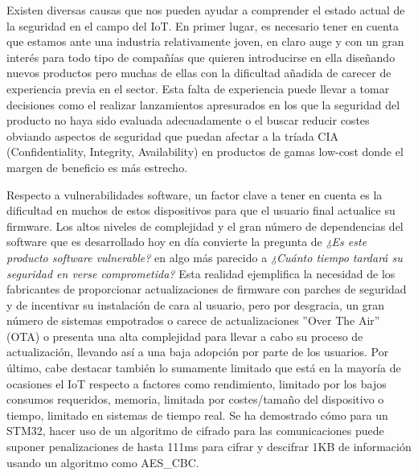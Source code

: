 Existen diversas causas que nos pueden ayudar a comprender el estado actual de la seguridad en el campo del IoT.
En primer lugar, es necesario tener en cuenta que estamos ante una industria relativamente 
joven, en claro auge y con un gran interés para todo tipo de compañías que quieren introducirse en ella diseñando 
nuevos productos pero muchas de ellas con la dificultad añadida de carecer de experiencia previa en el sector.
Esta falta de experiencia puede llevar a tomar decisiones como el realizar lanzamientos apresurados en los que la seguridad del producto no haya 
sido evaluada adecuadamente o el buscar reducir costes obviando aspectos de seguridad que puedan afectar a 
la tríada CIA (Confidentiality, Integrity, Availability) en productos de gamas low-cost donde el margen de beneficio 
es más estrecho.\bigskip

Respecto a vulnerabilidades software, un factor clave a tener en cuenta es la dificultad en muchos de estos 
dispositivos para que el usuario final actualice su firmware. Los altos niveles de complejidad y el gran número de dependencias del software
que es desarrollado hoy en día convierte la pregunta de \textit{¿Es este producto software vulnerable?} en algo más parecido a 
\textit{¿Cuánto tiempo tardará su seguridad en verse comprometida?} Esta realidad ejemplifica la necesidad de los fabricantes de 
proporcionar actualizaciones de firmware con parches de seguridad y de incentivar su instalación de cara al usuario, pero por 
desgracia, un gran número de sistemas empotrados o carece de actualizaciones ''Over The Air'' (OTA) o presenta una alta complejidad para 
llevar a cabo su proceso de actualización, llevando así a una baja adopción por parte de los usuarios.
Por último, cabe destacar también lo sumamente limitado que está en la mayoría de ocasiones el IoT respecto a factores como 
rendimiento, limitado por los bajos consumos requeridos, memoria, limitada por costes/tamaño del dispositivo o tiempo, limitado en sistemas de tiempo real. 
Se ha demostrado cómo para un STM32, hacer uso de un algoritmo de cifrado para las comunicaciones puede suponer 
penalizaciones de hasta 111ms\cite{performance} para cifrar y descifrar 1KB de información usando un algoritmo como AES\_CBC.\bigskip


